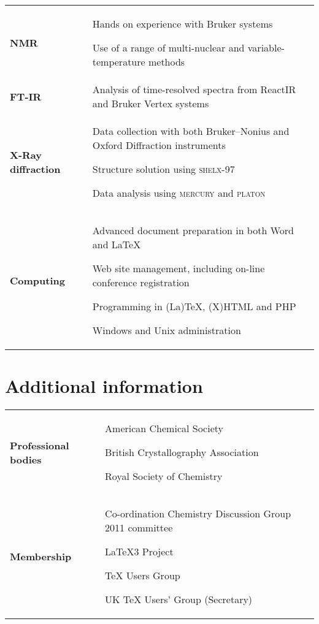 \documentclass[11pt,draft]{article}
\makeatletter
\newcommand*\AllTeX{(La)TeX}
\renewcommand*\LaTeX{LaTeX}
\renewcommand*\TeX{TeX}
\newlength\sidewidth
\newlength\mainwidth
\newenvironment{CVtable}
  {%
    \begin{tabular}
      {@{}>{\bfseries}p{\sidewidth}@{}>{\RaggedRight}p{\mainwidth}@{}}%
  }
  {\end{tabular}}
\makeatother
\begin{document}
\begin{CVtable}
  NMR & 
    Hands on experience with Bruker systems \par
    Use of a range of multi-nuclear and variable-temperature methods
  \\
    
  FT-IR & 
    Analysis of time-resolved spectra from ReactIR and Bruker Vertex 
      systems
  \\
    
  X-Ray diffraction &
    Data collection with both Bruker--Nonius and Oxford Diffraction 
      instruments \par
    Structure solution using \textsc{shelx-97} \par
    Data analysis using \textsc{mercury} and \textsc{platon}
  \\  
  
  Computing & 
    Advanced document preparation in both Word and \LaTeX \par
    Web site management, including on-line conference registration \par
    Programming in \AllTeX{}, (X)HTML and PHP \par
    Windows and Unix administration
  \\
\end{CVtable}

\section{Additional information}

\begin{CVtable}
  Professional bodies &
    American Chemical Society \par
    British Crystallography Association  \par
    Royal Society of Chemistry
  \\
  
  Membership &
    Co-ordination Chemistry Discussion Group 2011 committee \par
    \LaTeX3 Project \par
    \TeX{} Users Group \par
    UK \TeX{} Users' Group (Secretary) 
  \\
    
%    
\end{CVtable}
\end{document}

